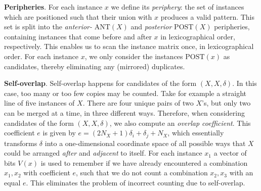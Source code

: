 \documentclass{llncs}
\begin{document}
\smallskip \noindent \textbf{Peripheries}. For each instance $x$ we define its \emph{periphery}: the set of instances which are positioned such that their union with $x$ produces a valid pattern. This set is split into the \emph{anterior-} $\mathrm{ANT}(X)$ and \emph{posterior} $\mathrm{POST}(X)$ peripheries, containing instances that come before and after $x$ in lexicographical order, respectively. This enables us to scan the instance matrix once, in lexicographical order. For each instance $x$, we only consider the instances $\mathrm{POST}(x)$ as candidates, thereby eliminating any (mirrored) duplicates. 

\smallskip \noindent \textbf{Self-overlap}. Self-overlap happens for candidates of the form $(X,X,\delta)$. In this case, too many or too few copies may be counted. Take for example a straight line of five instances of $X$. There are four unique pairs of two $X$'s, but only two can be merged at a time, in three different ways. Therefore, when considering candidates of the form $(X,X,\delta)$, we also compute an \emph{overlap coefficient}. This coefficient $e$ is given by $e = (2N_X+1)\delta_i + \delta_j + N_X$, which essentially transforms $\delta$ into a one-dimensional coordinate space of all possible ways that $X$ could be arranged \emph{after} and \emph{adjacent} to itself. For each instance $x_1$ a vector of bits $V(x)$ is used to remember if we have already encountered a combination $x_1,x_2$ with coefficient $e$, such that we do not count a combination $x_2,x_3$ with an equal $e$. This eliminates the problem of incorrect counting due to self-overlap.
\end{document}
